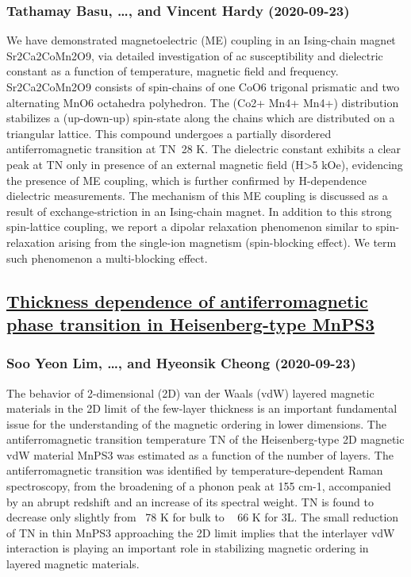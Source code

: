 \subsubsection*{Tathamay Basu, \dots, and Vincent Hardy (2020-09-23)}
We have demonstrated magnetoelectric (ME) coupling in an Ising-chain magnet
Sr2Ca2CoMn2O9, via detailed investigation of ac susceptibility and dielectric
constant as a function of temperature, magnetic field and frequency.
Sr2Ca2CoMn2O9 consists of spin-chains of one CoO6 trigonal prismatic and two
alternating MnO6 octahedra polyhedron. The (Co2+ Mn4+ Mn4+) distribution
stabilizes a (up-down-up) spin-state along the chains which are distributed on
a triangular lattice. This compound undergoes a partially disordered
antiferromagnetic transition at TN~28 K. The dielectric constant exhibits a
clear peak at TN only in presence of an external magnetic field (H>5 kOe),
evidencing the presence of ME coupling, which is further confirmed by
H-dependence dielectric measurements. The mechanism of this ME coupling is
discussed as a result of exchange-striction in an Ising-chain magnet. In
addition to this strong spin-lattice coupling, we report a dipolar relaxation
phenomenon similar to spin-relaxation arising from the single-ion magnetism
(spin-blocking effect). We term such phenomenon a multi-blocking effect.

\subsection*{\href{http://arxiv.org/abs/2009.10964v1}{Thickness dependence of antiferromagnetic phase transition in  Heisenberg-type MnPS3}}
\subsubsection*{Soo Yeon Lim, \dots, and Hyeonsik Cheong (2020-09-23)}
The behavior of 2-dimensional (2D) van der Waals (vdW) layered magnetic
materials in the 2D limit of the few-layer thickness is an important
fundamental issue for the understanding of the magnetic ordering in lower
dimensions. The antiferromagnetic transition temperature TN of the
Heisenberg-type 2D magnetic vdW material MnPS3 was estimated as a function of
the number of layers. The antiferromagnetic transition was identified by
temperature-dependent Raman spectroscopy, from the broadening of a phonon peak
at 155 cm-1, accompanied by an abrupt redshift and an increase of its spectral
weight. TN is found to decrease only slightly from ~78 K for bulk to ~ 66 K for
3L. The small reduction of TN in thin MnPS3 approaching the 2D limit implies
that the interlayer vdW interaction is playing an important role in stabilizing
magnetic ordering in layered magnetic materials.

